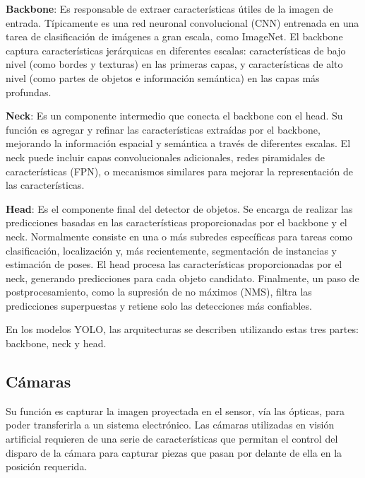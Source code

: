 \textbf{Backbone}: Es responsable de extraer características útiles de la imagen de entrada. Típicamente es una red neuronal convolucional (CNN) entrenada en una tarea de clasificación de imágenes a gran escala, como ImageNet. El backbone captura características jerárquicas en diferentes escalas: características de bajo nivel (como bordes y texturas) en las primeras capas, y características de alto nivel (como partes de objetos e información semántica) en las capas más profundas.

\textbf{Neck}: Es un componente intermedio que conecta el backbone con el head. Su función es agregar y refinar las características extraídas por el backbone, mejorando la información espacial y semántica a través de diferentes escalas. El neck puede incluir capas convolucionales adicionales, redes piramidales de características (FPN), o mecanismos similares para mejorar la representación de las características.

\textbf{Head}: Es el componente final del detector de objetos. Se encarga de realizar las predicciones basadas en las características proporcionadas por el backbone y el neck. Normalmente consiste en una o más subredes específicas para tareas como clasificación, localización y, más recientemente, segmentación de instancias y estimación de poses. El head procesa las características proporcionadas por el neck, generando predicciones para cada objeto candidato. Finalmente, un paso de postprocesamiento, como la supresión de no máximos (NMS), filtra las predicciones superpuestas y retiene solo las detecciones más confiables.

En los modelos YOLO, las arquitecturas se describen utilizando estas tres partes: backbone, neck y head.


    






\subsection{Cámaras}

Su función es capturar la imagen proyectada en el sensor, vía las ópticas, para poder transferirla a un sistema electrónico. Las cámaras utilizadas en visión artificial requieren de una serie de características que permitan el control del disparo de la cámara para capturar piezas que pasan por delante de ella  en la posición requerida.


